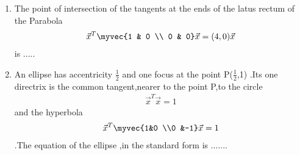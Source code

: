 \begin{enumerate}[label=\arabic*]
\item The point of intersection of the tangents at the ends of the latus rectum of the Parabola \begin{align} \vec x^T \myvec{1 & 0 \\ 0 & 0} \vec x=(4,0)\vec x \end{align} is .....
    
\item An ellipse has accentricity $\frac{1}{2}$ and one focus at the point P($\frac{1}{2}$,1) .Its one directrix is the common tangent,nearer to the point P,to the circle \begin{align}\vec x^T \vec x =1\end{align} and the hyperbola \begin{align}\vec x^T \myvec{1&0 \\0 &-1}\vec x=1\end{align}.The equation of the ellipse ,in the standard form is .......
\end{enumerate}

